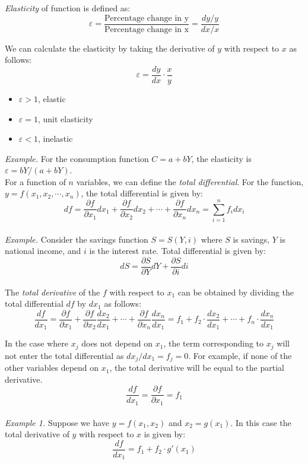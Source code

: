 \documentclass{./../../latex/handout}
\begin{document}
\textit{Elasticity} of function is defined as:
\[ \varepsilon = \frac{\text{Percentage change in y}}{\text{Percentage change in x}} = \frac{dy/y}{dx/x} \] 

We can calculate the elasticity by taking the derivative of $y$ with respect to $x$ as follows:
\[ \varepsilon = \frac{dy}{dx} \cdot \frac{x}{y} \]
\begin{itemize}
	\item $\varepsilon>1$, elastic
	\item $\varepsilon=1$, unit elasticity
	\item $\varepsilon<1$, inelastic \\
\end{itemize}

\textit{Example.} For the consumption function $ C = a + bY $, the elasticity is $\varepsilon = b Y/(a+bY)$. \\

For a function of $n$ variables, we can define the \textit{total differential}. For the function,  $y=f\left(x_{1}, x_{2}, \cdots, x_{n}\right)$, the total differential is given by:
\[
d f=\frac{\partial f}{\partial x_{1}} d x_{1}+\frac{\partial f}{\partial x_{2}} d x_{2}+\cdots+\frac{\partial f}{\partial x_{n}} d x_{n}=\sum_{i=1}^{n} f_{i} d x_{i}
\] \\


\textit{Example.} Consider the savings function $S=S(Y, i)$ where $S$ is savings, $Y$ is national income, and $i$ is the interest rate. Total differential is given by:
\[ 
d S=\frac{\partial S}{\partial Y} d Y+\frac{\partial S}{\partial i} d i
\] \\

The \textit{total derivative} of the $f$ with respect to $x_1$ can be obtained by dividing the total differential $df$ by $dx_1$ as follows:
\[
\frac{d f}{d x_1}=\frac{\partial f}{\partial x_{1}} +\frac{\partial f}{\partial x_{2}} \frac{d x_{2}}{d x_1}+\cdots+\frac{\partial f}{\partial x_{n}} \frac{d x_{n}}{d x_1} = f_1 +f_2\cdot \frac{d x_{2}}{d x_1}+\cdots+f_n \cdot\frac{d x_{n}}{d x_1} \]

In the case where $x_j$ does not depend on $x_1$, the term corresponding to $x_j$ will not enter the total differential as $d x_j/d x_1 = f_j= 0$. For example, if none of the other variables depend on $x_1$, the total derivative will be equal to the partial derivative. 
\[ \frac{d f}{d x_1} = \frac{\partial f}{\partial x_{1}} = f_1 \] \\

\textit{Example 1.} Suppose we have  $y = f(x_1, x_2)$ and $x_2 = g(x_1)$. In this case the total derivative of $y$ with respect to $x$ is given by:
\[ \frac{d f}{d x_1} = f_1+f_2 \cdot g'(x_1) \] \\
\end{document}
